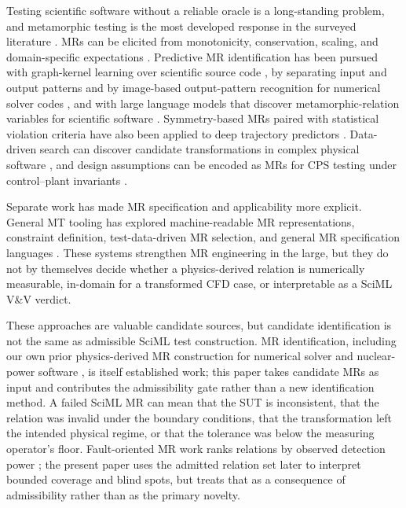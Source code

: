 \documentclass[preprint,12pt]{elsarticle}
\begin{document}
Testing scientific software without a reliable oracle is a long-standing problem, and metamorphic testing is the most developed response in the surveyed literature \citep{kanewalaBieman2014slr}. MRs can be elicited from monotonicity, conservation, scaling, and domain-specific expectations \citep{kanewala2019scientific,lin2020exploratory,olsen2019simulation,raunak2021continuum}. Predictive MR identification has been pursued with graph-kernel learning over scientific source code \citep{kanewala2016graphkernel}, by separating input and output patterns and by image-based output-pattern recognition for numerical solver codes \citep{wang2022mridentification,fu2021burnup}, and with large language models that discover metamorphic-relation variables for scientific software \citep{tsigkanos2023}. Symmetry-based MRs paired with statistical violation criteria have also been applied to deep trajectory predictors \citep{spieker2024trajectory,spieker2025multimodal}. Data-driven search can discover candidate transformations in complex physical software \citep{hiremath2021ocean}, and design assumptions can be encoded as MRs for CPS testing under control--plant invariants \citep{mandrioli2025cps}.

Separate work has made MR specification and applicability more explicit. General MT tooling has explored machine-readable MR representations, constraint definition, test-data-driven MR selection, and general MR specification languages \citep{duqueTorres2023completePipeline,duqueTorres2024selecting,sun2026ccml}. These systems strengthen MR engineering in the large, but they do not by themselves decide whether a physics-derived relation is numerically measurable, in-domain for a transformed CFD case, or interpretable as a SciML V\&V verdict.

These approaches are valuable candidate sources, but candidate identification is not the same as admissible SciML test construction. MR identification, including our own prior physics-derived MR construction for numerical solver and nuclear-power software \citep{li2022nuclearmr,wang2022mridentification}, is itself established work; this paper takes candidate MRs as input and contributes the admissibility gate rather than a new identification method. A failed SciML MR can mean that the SUT is inconsistent, that the relation was invalid under the boundary conditions, that the transformation left the intended physical regime, or that the tolerance was below the measuring operator's floor. Fault-oriented MR work ranks relations by observed detection power \citep{srinivasan2022prioritization,saha2019faultdetection}; the present paper uses the admitted relation set later to interpret bounded coverage and blind spots, but treats that as a consequence of admissibility rather than as the primary novelty.
\end{document}
